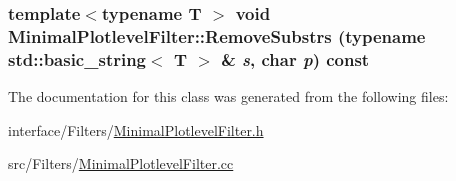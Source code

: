 \label{classMinimalPlotlevelFilter_aaefe1a2b934ecae86dadad1d99b36e26}
\hypertarget{classMinimalPlotlevelFilter_a684d038fb986d2dd9a52e24fe0a4c695}{
\subsubsection[{RemoveSubstrs}]{\setlength{\rightskip}{0pt plus 5cm}template$<$typename T $>$ void MinimalPlotlevelFilter::RemoveSubstrs (typename std::basic\_\-string$<$ T $>$ \& {\em s}, \/  char {\em p}) const}}
\label{classMinimalPlotlevelFilter_a684d038fb986d2dd9a52e24fe0a4c695}


The documentation for this class was generated from the following files:\begin{DoxyCompactItemize}
\item 
interface/Filters/\hyperlink{MinimalPlotlevelFilter_8h}{MinimalPlotlevelFilter.h}\item 
src/Filters/\hyperlink{MinimalPlotlevelFilter_8cc}{MinimalPlotlevelFilter.cc}\end{DoxyCompactItemize}

